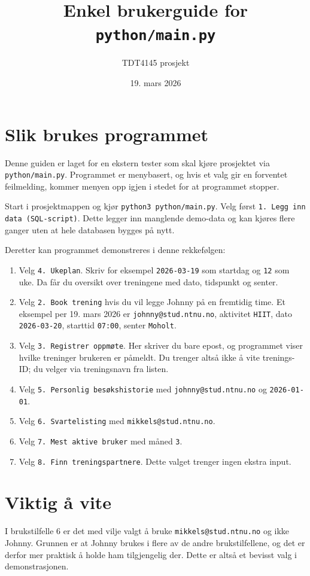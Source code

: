 \documentclass[11pt,a4paper]{article}
\title{Enkel brukerguide for \texttt{python/main.py}}
\author{TDT4145 prosjekt}
\date{19. mars 2026}
\begin{document}
\maketitle

\section*{Slik brukes programmet}
Denne guiden er laget for en ekstern tester som skal kjøre prosjektet via
\texttt{python/main.py}. Programmet er menybasert, og hvis et valg gir en
forventet feilmelding, kommer menyen opp igjen i stedet for at programmet
stopper.

Start i prosjektmappen og kjør \texttt{python3 python/main.py}. Velg først
\texttt{1. Legg inn data (SQL-script)}. Dette legger inn manglende demo-data og
kan kjøres flere ganger uten at hele databasen bygges på nytt.

Deretter kan programmet demonstreres i denne rekkefølgen:

\begin{enumerate}[leftmargin=1.6em]
    \item Velg \texttt{4. Ukeplan}. Skriv for eksempel \texttt{2026-03-19} som
    startdag og \texttt{12} som uke. Da får du oversikt over treningene med dato,
    tidspunkt og senter.
    \item Velg \texttt{2. Book trening} hvis du vil legge Johnny på en fremtidig
    time. Et eksempel per 19. mars 2026 er \texttt{johnny@stud.ntnu.no},
    aktivitet \texttt{HIIT}, dato \texttt{2026-03-20}, starttid \texttt{07:00},
    senter \texttt{Moholt}.
    \item Velg \texttt{3. Registrer oppmøte}. Her skriver du bare epost, og
    programmet viser hvilke treninger brukeren er påmeldt. Du trenger altså ikke
    å vite trenings-ID; du velger via treningsnavn fra listen.
    \item Velg \texttt{5. Personlig besøkshistorie} med
    \texttt{johnny@stud.ntnu.no} og \texttt{2026-01-01}.
    \item Velg \texttt{6. Svartelisting} med \texttt{mikkels@stud.ntnu.no}.
    \item Velg \texttt{7. Mest aktive bruker} med måned \texttt{3}.
    \item Velg \texttt{8. Finn treningspartnere}. Dette valget trenger ingen
    ekstra input.
\end{enumerate}

\section*{Viktig å vite}
I brukstilfelle 6 er det med vilje valgt å bruke \texttt{mikkels@stud.ntnu.no}
og ikke Johnny. Grunnen er at Johnny brukes i flere av de andre brukstilfellene,
og det er derfor mer praktisk å holde ham tilgjengelig der. Dette er altså et
bevisst valg i demonstrasjonen.
\end{document}
